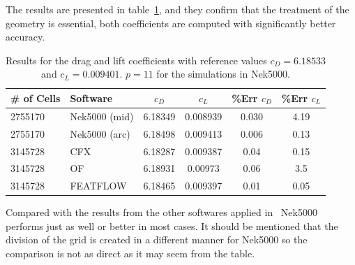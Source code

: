 The results are presented in table~\ref{tab:testcase}, and they confirm that the treatment of the geometry is 
essential, both coefficients are computed with significantly better accuracy. 
%
\begin{table}
\centering
\begin{tabular}{l l c c c c}
		\toprule
		\# of Cells & Software & $c_D$ & $c_L$ & \%\textbf{Err} $c_D$ &\%\textbf{Err} $c_L$ \\ \midrule 
		2755170& Nek5000 (mid) & 6.18349 & 0.008939 & 0.030 & 4.19 \\ 
		2755170& Nek5000 (arc) & 6.18498 & 0.009413 & 0.006 & 0.13 \\
		3145728 & CFX 		 & 6.18287 & 0.009387 & 0.04 &0.15 \\
		3145728 & OF	     & 6.18931 & 0.00973 & 0.06 &3.5 \\
		3145728 & FEATFLOW   & 6.18465 & 0.009397 & 0.01 &0.05 \\
		\bottomrule	
	\end{tabular}
	\caption{Results for the drag and lift coefficients with reference values 
	$c_D = 6.18533$ and $c_L = 0.009401$. $p=11$ for the simulations in Nek5000.}
\label{tab:testcase}
\end{table}
%
Compared with the results from the other softwares applied in~\cite{benchmark} Nek5000 performs 
just as well or better in most cases. It should be mentioned that the division of the grid is created
in a different manner for Nek5000 so the comparison is not as direct as it may seem from the table.


